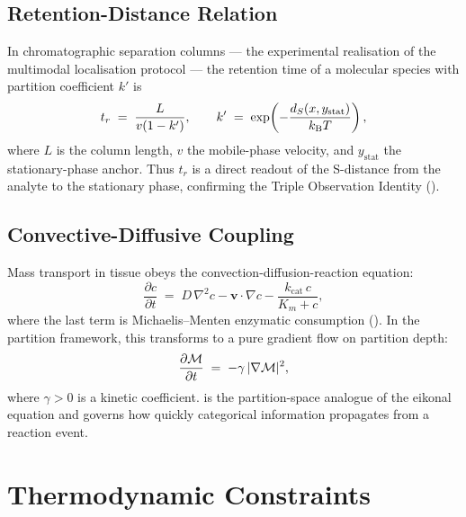 \subsection{Retention-Distance Relation}

In chromatographic separation columns --- the experimental realisation of the
multimodal localisation protocol --- the retention time of a molecular species
with partition coefficient $k'$ is
\begin{equation}
  t_r \;=\; \frac{L}{v(1 - k')},
  \qquad
  k' \;=\; \exp\!\left(-\frac{d_S(x, y_{\mathrm{stat}})}{k_{\mathrm{B}} T}\right),
  \label{eq:retention}
\end{equation}
where $L$ is the column length, $v$ the mobile-phase velocity, and
$y_{\mathrm{stat}}$ the stationary-phase anchor.  Thus $t_r$ is a direct
readout of the S-distance from the analyte to the stationary phase, confirming
the Triple Observation Identity ().

\subsection{Convective-Diffusive Coupling}

Mass transport in tissue obeys the convection-diffusion-reaction equation:
\begin{equation}
  \frac{\partial c}{\partial t}
  \;=\; D\,\nabla^2 c - \mathbf{v}\cdot\nabla c
    - \frac{k_{\mathrm{cat}}\,c}{K_m + c},
  \label{eq:convdiff}
\end{equation}
where the last term is Michaelis--Menten enzymatic consumption
().  In the partition framework, this transforms to a
pure gradient flow on partition depth:
\begin{equation}
  \frac{\partial \mathcal{M}}{\partial t}
  \;=\; -\gamma\,|\nabla\mathcal{M}|^{2},
  \label{eq:depth-gradient-flow}
\end{equation}
where $\gamma > 0$ is a kinetic coefficient.  
is the partition-space analogue of the eikonal equation and governs how
quickly categorical information propagates from a reaction event.

\section{Thermodynamic Constraints}
\label{sec:thermo-constraints}

